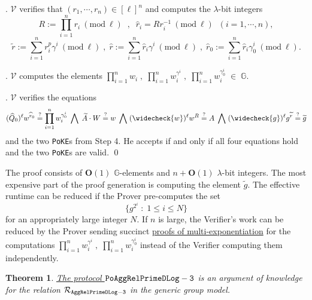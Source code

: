 \documentclass[11pt, lettersize, notitlepage, leqno, footskip=0.6cm]{article}
\newcommand{\pl}{\prod\limits}
\newcommand{\slim}{\sum\limits}
\newcommand{\bG}{\mathbb{G}}
\newcommand{\wti}{\widetilde}
\newcommand{\mc}{\mathcal}
\newcommand{\mb}{\mathbb}
\newcommand{\mbf}{\mathbf}
\newcommand{\lam}{\lambda}
\newcommand{\what}{\widehat}
\newcommand{\weck}{\widecheck}
\newcommand{\bO}{\mbf{O}}
\newcommand{\V}{\mc{V}}
\newcommand{\vs}{\vspace{-0.15cm}}
\newcommand{\noin}{\noindent}
\newcommand{\sta}{\stackrel{?}{=}}
\newcommand{\Mod}[1]{\ (\mathrm{mod}\ #1)}
\newtheorem{Thm}{Theorem}[section]
\numberwithin{equation}{section}
\begin{document}
\begin{enumerate}[wide, labelwidth=!, labelindent=0pt]
\noin 13. $\V$ verifies that $(r_1,\cdots,r_n)\in [\ell]^{n}$ and computes the $\lam$-bit integers \vs $$R:= \pl_{i=1}^n r_i\Mod{\ell} \;\;,\;\;\what{r}_i = Rr_i^{-1}\Mod{\ell}\;\;(i=1,\cdots,n),$$\vspace{-0.3cm} $$\wti{r}:= \slim_{i=1}^n {r}_i^{p}\gamma^i\Mod{\ell} \;,\; \what{r}:= \slim_{i=1}^n \what{r}_i\gamma^i\Mod{\ell}\;,\;\what{r}_0:= \slim_{i=1}^n \what{r}_i\gamma_{0}^i\Mod{\ell}.$$

\noin 14. $\V$ computes the elements $\pl_{i=1}^n w_i\;,\;\pl_{i=1}^n w_i^{\gamma^i}\;,\;\pl_{i=1}^n w_i^{\gamma_0^i}\;\in\;\bG$.

\noin 15. $\V$ verifies the equations \vs $$(\what{Q}_0)^{\ell}w^{\what{r}_0}\sta \pl_{i=1}^n w_i^{\gamma_{0}^i}\;\bigwedge\; \wti{A}\cdot W\sta w\;\bigwedge\; (\weck{w})^{\ell}w^R\sta A\;\bigwedge\; (\weck{g})^{\ell}g^{\wti{r}}\sta\wti{g}$$ and the two \verb|PoKE|s from Step 4. He accepts if and only if all four equations hold and the two \verb|PoKE|s are valid. \qed \end{enumerate}

\noin The proof consists of $\bO(1)$ $\mb{G}$-elements and $n+\bO(1)$ $\lam$-bit integers. The most expensive part of the proof generation is computing the element $\wti{g}$. The effective runtime can be reduced if the Prover pre-computes the set $$\{g^{2^i}\;:\;1\leq i\leq N  \}$$ for an appropriately large integer $N$. If $n$ is large, the Verifier's work can be reduced by the Prover sending succinct \hyperlink{PoME}{proofs of multi-exponentiation} for the computations $\prod_{i=1}^n w_i^{\gamma^i}\;,\;\prod_{i=1}^n w_i^{\gamma_0^i}$ instead of the Verifier computing them independently.

\vspace{0.15cm}

\begin{Thm} \hyperlink{RP3}{The protocol ${\tt{PoAggRelPrimeDLog}-3}$} is an argument of knowledge for the relation $\mc{R}_{\tt{AggRelPrimeDLog-3}}$ in the generic group model.\end{Thm}
\end{document}
